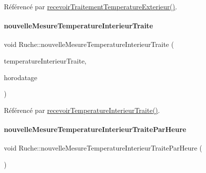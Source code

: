 Référencé par \hyperlink{class_ruche_a8482dda95a8a7888d5a60ea6f7d8729e}{recevoir\+Traitement\+Temperature\+Exterieur()}.

\mbox{\label{class_ruche_aa63b4fd7c695ef77c9ff4b684ed8ce91}} 
\paragraph{\texorpdfstring{nouvelle\+Mesure\+Temperature\+Interieur\+Traite}{nouvelleMesureTemperatureInterieurTraite}}
{\footnotesize\ttfamily void Ruche\+::nouvelle\+Mesure\+Temperature\+Interieur\+Traite (\begin{DoxyParamCaption}\item[{double}]{temperature\+Interieur\+Traite,  }\item[{Q\+String}]{horodatage }\end{DoxyParamCaption})\hspace{0.3cm}{\ttfamily [signal]}}



Référencé par \hyperlink{class_ruche_a3a5934e6da843c959f34aecef1217f92}{recevoir\+Temperature\+Interieur\+Traite()}.

\mbox{\label{class_ruche_a5fdf12cb02acc7283f183a7aad906edc}} 
\paragraph{\texorpdfstring{nouvelle\+Mesure\+Temperature\+Interieur\+Traite\+Par\+Heure}{nouvelleMesureTemperatureInterieurTraiteParHeure}}
{\footnotesize\ttfamily void Ruche\+::nouvelle\+Mesure\+Temperature\+Interieur\+Traite\+Par\+Heure (\begin{DoxyParamCaption}{ }\end{DoxyParamCaption})\hspace{0.3cm}{\ttfamily [signal]}}



